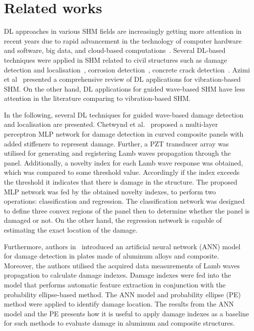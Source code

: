 \section{Related works}
\label{related_works}
DL approaches in various SHM fields are increasingly getting more attention in recent years due to rapid advancement in the technology of computer hardware and software, big data, and cloud-based computations~\cite{Azimi}.
Several DL-based techniques were applied in SHM related to civil structures such as damage detection and localisation~\cite{Cha2018, Kong2018}, corrosion detection~\cite{Atha2018}, concrete crack detection~\cite{Dung2019}.
Azimi et al~\cite{Azimi} presented a comprehensive review of DL applications for vibration-based SHM.
On the other hand, DL applications for guided wave-based SHM have less attention in the literature comparing to vibration-based SHM.

In the following, several DL techniques for guided wave-based damage detection and localisation are presented.
Chetwynd et al.~\cite{Chetwynd2008} proposed a multi-layer perceptron MLP network for damage detection in curved composite panels with added stiffeners to represent damage.
Further, a PZT transducer array was utilised for generating and registering Lamb waves propagation through the panel.
Additionally, a novelty index for each Lamb wave response was obtained,
which was compared to some threshold value. 
Accordingly if the index exceeds the threshold it indicates that there is damage in the structure. 
The proposed MLP network was fed by the obtained novelty indexes, to perform two operations: classification and regression. 
The classification network was designed to define three convex regions of the panel then to determine whether the panel is damaged or not. 
On the other hand, the regression network is capable of estimating the exact location of the damage.
 
Furthermore, authors in~\cite{DeFenza2015} introduced an artificial neural network (ANN) model for damage detection in plates made of aluminum alloys and composite.
Moreover, the authors utilised the acquired data measurements of Lamb waves propagation to calculate damage indexes.
Damage indexes were fed into the model that performs automatic feature extraction in conjunction with the probability ellipse-based method. 
The ANN model and probability ellipse (PE) method were applied to identify damage location.
The results from the ANN model and the PE presents how it is useful to apply damage indexes as a baseline for such methods to evaluate damage in aluminum and composite structures. 

